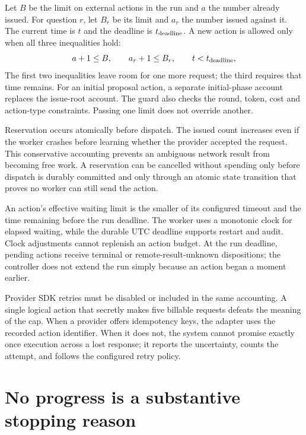 
Let $B$ be the limit on external actions in the run and $a$ the number already
issued. For question $r$, let $B_r$ be its limit and $a_r$ the number issued
against it. The current time is $t$ and the deadline is $t_{\rm deadline}$. A
new action is allowed only when all three inequalities hold:
\begin{equation}
 a+1\leq B,\qquad a_r+1\leq B_r,\qquad t<t_{\rm deadline},
 \label{eq:budget-guard}
\end{equation}
The first two inequalities leave room for one more request; the third requires
that time remains. For an initial proposal action, a separate initial-phase account replaces the
issue-root account. The guard also checks the round, token, cost and action-type
constraints. Passing one limit does not override another.

Reservation occurs atomically before dispatch. The issued count increases even if
the worker crashes before learning whether the provider accepted the request.
This conservative accounting prevents an ambiguous network result from becoming
free work. A reservation can be cancelled without spending only before dispatch
is durably committed and only through an atomic state transition that proves no
worker can still send the action.

An action's effective waiting limit is the smaller of its configured timeout
and the time remaining before the run deadline. The worker uses a monotonic clock
for elapsed waiting, while the durable UTC deadline supports restart and audit.
Clock adjustments cannot replenish an action budget. At the run deadline, pending
actions receive terminal or remote-result-unknown dispositions; the controller
does not extend the run simply because an action began a moment earlier.

Provider SDK retries must be disabled or included in the same accounting. A
single logical action that secretly makes five billable requests defeats the
meaning of the cap. When a provider offers idempotency keys, the adapter uses the
recorded action identifier. When it does not, the system cannot promise exactly
once execution across a lost response; it reports the uncertainty, counts the
attempt, and follows the configured retry policy.

\section{No progress is a substantive stopping reason}
\label{merge:M06:13}


